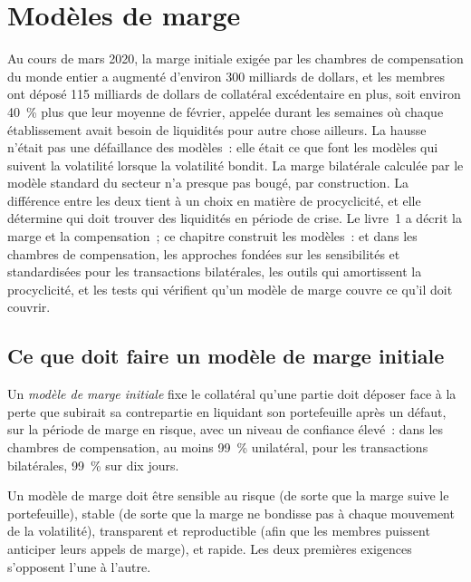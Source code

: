\chapter{Modèles de marge}\label{ch:rc:margin-models}

Au cours de mars 2020, la marge initiale exigée par les chambres de compensation du monde entier a augmenté d'environ 300
milliards de dollars, et les membres ont déposé 115 milliards de dollars de collatéral excédentaire en plus, soit environ 40~\%
plus que leur moyenne de février, appelée durant les semaines où chaque établissement avait besoin de liquidités pour autre chose
ailleurs. La hausse n'était pas une défaillance des modèles~: elle était ce que font les modèles qui suivent la volatilité lorsque
la volatilité bondit. La marge bilatérale calculée par le modèle standard du secteur n'a presque pas bougé, par construction.
La différence entre les deux tient à un choix en matière de procyclicité, et elle détermine qui doit trouver
des liquidités en période de crise. Le livre~1 a décrit la marge et la compensation~; ce chapitre construit les
modèles~:  et  dans les chambres de compensation, les approches fondées sur les sensibilités et
standardisées pour les transactions bilatérales, les outils qui amortissent la procyclicité, et les tests
qui vérifient qu'un modèle de marge couvre ce qu'il doit couvrir.

\section{Ce que doit faire un modèle de marge initiale}

\begin{definition}\label{def:rc:margin-models:model}
Un \emph{modèle de marge initiale} fixe le collatéral qu'une partie doit déposer
face à la perte que subirait sa contrepartie en liquidant son portefeuille après un défaut, sur
la période de marge en risque, avec un niveau de confiance élevé~: dans les chambres de compensation, au moins 99~\% unilatéral, pour
les transactions bilatérales, 99~\% sur dix jours.
\end{definition}

Un modèle de marge doit être sensible au risque (de sorte que la marge suive le portefeuille), stable (de sorte que
la marge ne bondisse pas à chaque mouvement de la volatilité), transparent et reproductible (afin que les membres
puissent anticiper leurs appels de marge), et rapide. Les deux premières exigences s'opposent l'une à l'autre.

